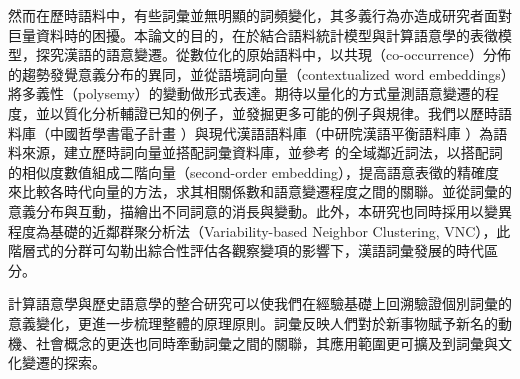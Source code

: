 然而在歷時語料中，有些詞彙並無明顯的詞頻變化，其多義行為亦造成研究者面對巨量資料時的困擾。本論文的目的，在於結合語料統計模型與計算語意學的表徵模型，探究漢語的語意變遷。從數位化的原始語料中，以共現（co-occurrence）分佈的趨勢發覺意義分布的異同，並從語境詞向量（contextualized word embeddings）將多義性（polysemy）的變動做形式表達。期待以量化的方式量測語意變遷的程度，並以質化分析輔證已知的例子，並發掘更多可能的例子與規律。我們以歷時語料庫（中國哲學書電子計畫 \parencite{sturgeon2019ctext}）與現代漢語語料庫（中研院漢語平衡語料庫 \parencite{chen1996sinica}）為語料來源，建立歷時詞向量並搭配詞彙資料庫，並參考 \textcite{hamilton2016cultural} 的全域鄰近詞法，以搭配詞的相似度數值組成二階向量（second-order embedding），提高語意表徵的精確度來比較各時代向量的方法，求其相關係數和語意變遷程度之間的關聯。並從詞彙的意義分布與互動，描繪出不同詞意的消長與變動。此外，本研究也同時採用以變異程度為基礎的近鄰群聚分析法（Variability-based Neighbor Clustering, VNC）\parencite{gries2012variability}，此階層式的分群可勾勒出綜合性評估各觀察變項的影響下，漢語詞彙發展的時代區分。

計算語意學與歷史語意學的整合研究可以使我們在經驗基礎上回溯驗證個別詞彙的意義變化，更進一步梳理整體的原理原則。詞彙反映人們對於新事物賦予新名的動機、社會概念的更迭也同時牽動詞彙之間的關聯，其應用範圍更可擴及到詞彙與文化變遷的探索。
